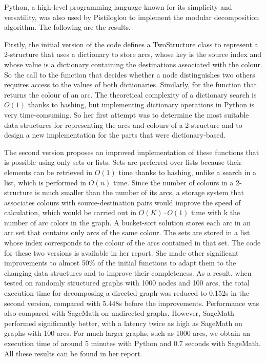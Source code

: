 Python, a high-level programming language known for its simplicity and versatility, was also used by Pistiloglou to implement the modular decomposition algorithm.
The following are the results.

Firstly, the initial version of the code defines a TwoStructure class to represent a 2-structure that uses a dictionary to store arcs, whose key is the source index and whose value is a dictionary containing the destinations associated with the colour.
So the call to the function that decides whether a node distinguishes two others requires access to the values of both dictionaries.
Similarly, for the function that returns the colour of an arc.
The theoretical complexity of a dictionary search is $O(1)$ thanks to hashing, but implementing dictionary operations in Python is very time-consuming.
So her first attempt was to determine the most suitable data structures for representing the arcs and colours of a 2-structure and to design a new implementation for the parts that were dictionary-based.

The second version proposes an improved implementation of these functions that is possible using only sets or lists.
Sets are preferred over lists because their elements can be retrieved in $O(1)$ time thanks to hashing, unlike a search in a list, which is performed in $O(n)$ time.
Since the number of colours in a 2-structure is much smaller than the number of its arcs, a storage system that associates colours with source-destination pairs would improve the speed of calculation, which would be carried out in $O(K) \cdot O(1)$ time with k the number of arc colors in the graph.
A bucket-sort solution stores each arc in an arc set that contains only arcs of the same colour.
The sets are stored in a list whose index corresponds to the colour of the arcs contained in that set.
The code for these two versions is available in her report.
She made other significant improvements to almost 50\% of the initial functions to adapt them to the changing data structures and to improve their completeness.
As a result, when tested on randomly structured graphs with 1000 nodes and 100 arcs, the total execution time for decomposing a directed graph was reduced to 0.152s in the second version, compared with 5.448s before the improvements.
Performance was also compared with SageMath on undirected graphs.
However, SageMath performed significantly better, with a latency twice as high as SageMath on graphs with 100 arcs.
For much larger graphs, such as 1000 arcs, we obtain an execution time of around 5 minutes with Python and 0.7 seconds with SageMath.
All these results can be found in her report.


